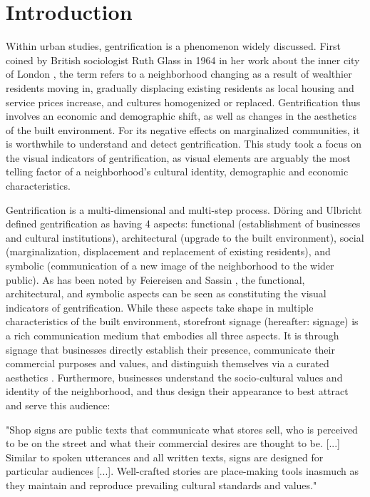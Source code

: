 \section{Introduction}
\label{sec:introduction}

Within urban studies, gentrification is a phenomenon widely discussed. First coined by British sociologist Ruth Glass in 1964 in her work about the inner city of London \cite{Glass1964}, the term refers to a neighborhood changing as a result of wealthier residents moving in, gradually displacing existing residents as local housing and service prices increase, and cultures homogenized or replaced. Gentrification thus involves an economic and demographic shift, as well as changes in the aesthetics of the built environment. For its negative effects on marginalized communities, it is worthwhile to understand and detect gentrification. This study took a focus on the visual indicators of gentrification, as visual elements are arguably the most telling factor of a neighborhood’s cultural identity, demographic and economic characteristics.

Gentrification is a multi-dimensional and multi-step process. Döring and Ulbricht \cite{döring_ulbricht_2018} defined gentrification as having 4 aspects: functional (establishment of businesses and cultural institutions), architectural (upgrade to the built environment), social (marginalization, displacement and replacement of existing residents), and symbolic (communication of a new image of the neighborhood to the wider public). As has been noted by Feiereisen and Sassin \cite{feiereisen_sounding_2021}, the functional, architectural, and symbolic aspects can be seen as constituting the visual indicators of gentrification. While these aspects take shape in multiple characteristics of the built environment, storefront signage (hereafter: signage) is a rich communication medium that embodies all three aspects. It is through signage that businesses directly establish their presence, communicate their commercial purposes and values, and distinguish themselves via a curated aesthetics \cite{rahman_signage_2020}. Furthermore, businesses understand the socio-cultural values and identity of the neighborhood, and thus design their appearance to best attract and serve this audience:

\begin{displayquote}
    "Shop signs are public texts that communicate what stores sell, who is perceived to be on the street and what their commercial desires are thought to be. [...] Similar to spoken utterances and all written texts, signs are designed for particular audiences [...]. Well-crafted stories are place-making tools inasmuch as they maintain and reproduce prevailing cultural standards and values." \cite{trinch_signsays_2017}
\end{displayquote}

